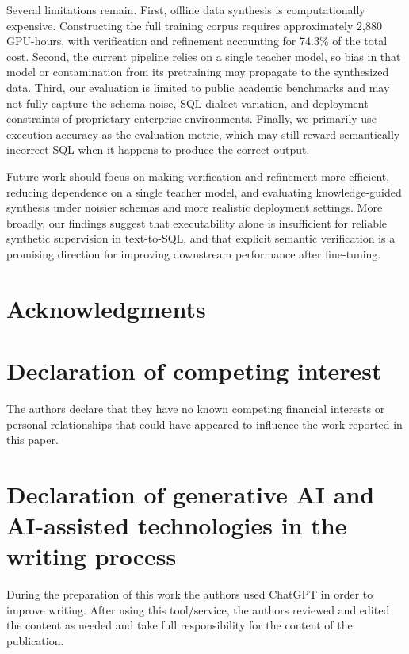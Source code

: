 \documentclass[letterpaper,journal]{IEEEtran}
\begin{document}
Several limitations remain. First, offline data synthesis is computationally expensive. Constructing the full training corpus requires approximately 2{,}880 GPU-hours, with verification and refinement accounting for 74.3\% of the total cost. Second, the current pipeline relies on a single teacher model, so bias in that model or contamination from its pretraining may propagate to the synthesized data. Third, our evaluation is limited to public academic benchmarks and may not fully capture the schema noise, SQL dialect variation, and deployment constraints of proprietary enterprise environments. Finally, we primarily use execution accuracy as the evaluation metric, which may still reward semantically incorrect SQL when it happens to produce the correct output.

Future work should focus on making verification and refinement more efficient, reducing dependence on a single teacher model, and evaluating knowledge-guided synthesis under noisier schemas and more realistic deployment settings. More broadly, our findings suggest that executability alone is insufficient for reliable synthetic supervision in text-to-SQL, and that explicit semantic verification is a promising direction for improving downstream performance after fine-tuning.


\section*{Acknowledgments}

\section*{Declaration of competing interest}
The authors declare that they have no known competing financial interests or personal relationships that could have appeared to influence the work reported in this paper.

\section*{Declaration of generative AI and AI-assisted technologies in the writing process}
During the preparation of this work the authors used ChatGPT in order to improve writing. After using this tool/service, the authors reviewed and edited the content as needed and take full responsibility for the content of the publication.



\end{document}
